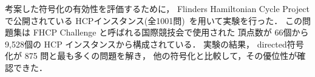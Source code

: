 考案した符号化の有効性を評価するために，
Flinders Hamiltonian Cycle Project で公開されている
HCPインスタンス(全1001問)~\cite{haythorpe19:fhcp}を用いて実験を行った．
この問題集は FHCP Challenge と呼ばれる国際競技会で使用された
頂点数が 66個から9,528個の HCP インスタンスから構成されている．
実験の結果，
\textsf{directed}符号化が 875 問と最も多くの問題を解き，
他の符号化と比較して，その優位性が確認できた．

